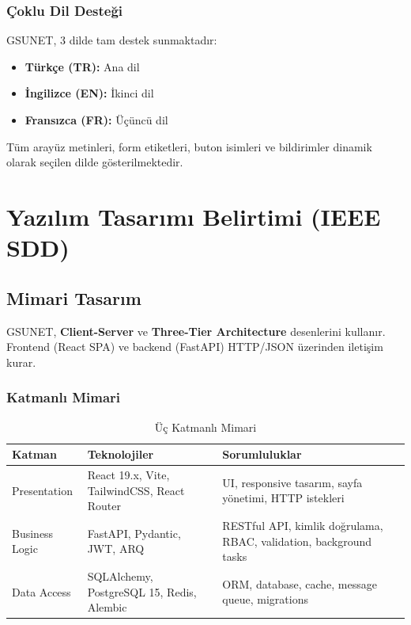 \documentclass[a4paper,12pt]{report}
\begin{document}
\subsection{Çoklu Dil Desteği}

GSUNET, 3 dilde tam destek sunmaktadır:
\begin{itemize}
    \item \textbf{Türkçe (TR):} Ana dil
    \item \textbf{İngilizce (EN):} İkinci dil
    \item \textbf{Fransızca (FR):} Üçüncü dil
\end{itemize}

Tüm arayüz metinleri, form etiketleri, buton isimleri ve bildirimler dinamik olarak seçilen dilde gösterilmektedir.

\chapter{Yazılım Tasarımı Belirtimi (IEEE SDD)}


\section{Mimari Tasarım}

GSUNET, \textbf{Client-Server} ve \textbf{Three-Tier Architecture} desenlerini kullanır. Frontend (React SPA) ve backend (FastAPI) HTTP/JSON üzerinden iletişim kurar.

\subsection{Katmanlı Mimari}

\begin{table}[h]
\centering
\small
\begin{tabular}{|p{2.8cm}|p{3.5cm}|p{6.5cm}|}
\hline
\textbf{Katman} & \textbf{Teknolojiler} & \textbf{Sorumluluklar} \\ \hline
Presentation & React 19.x, Vite, TailwindCSS, React Router & UI, responsive tasarım, sayfa yönetimi, HTTP istekleri \\ \hline
Business Logic & FastAPI, Pydantic, JWT, ARQ & RESTful API, kimlik doğrulama, RBAC, validation, background tasks \\ \hline
Data Access & SQLAlchemy, PostgreSQL 15, Redis, Alembic & ORM, database, cache, message queue, migrations \\ \hline
\end{tabular}
\caption{Üç Katmanlı Mimari}
\end{table}
\end{document}
